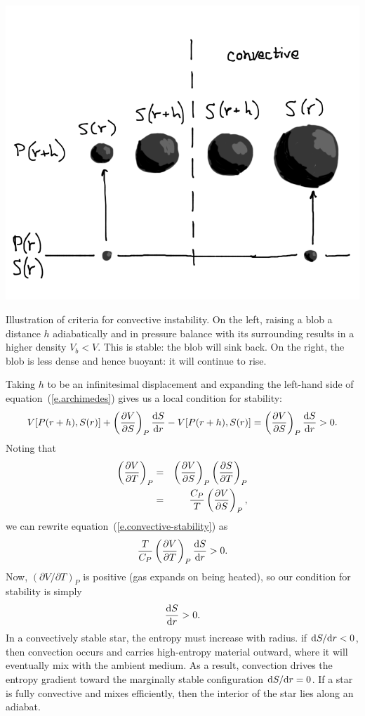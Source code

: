 \begin{marginfigure}
\includegraphics[width=\textwidth]{Figures/convective.png}
\caption{\label{f.convective-schematic}Illustration of criteria for convective instability.  On the left, raising a blob a distance $h$ adiabatically and in pressure balance with its surrounding results in a higher density $V_{b} < V$.  This is stable: the blob will sink back.  On the right, the blob is less dense and hence buoyant: it will continue to rise.}
\end{marginfigure}

Taking $h$ to be an infinitesimal displacement and expanding the left-hand side of equation~(\ref{e.archimedes}) gives us a local condition for stability:
\begin{equation}\label{e.convective-stability}
V[P(r+h),S(r)] + \left(\frac{\partial V}{\partial S}\right)_{P}\frac{\mathrm{d} S}{\mathrm{d} r} - V[P(r+h),S(r)]  = \left(\frac{\partial V}{\partial S}\right)_{P}\frac{\mathrm{d} S}{\mathrm{d} r} > 0 .
\end{equation}
Noting that
\begin{eqnarray*}
\left(\frac{\partial V}{\partial T}\right)_{P} &=& \left(\frac{\partial V}{\partial S}\right)_{P}\left(\frac{\partial S}{\partial T}\right)_{P}\\
 &=& \frac{C_{P}}{T}\left(\frac{\partial V}{\partial S}\right)_{P},
 \end{eqnarray*}
 we can rewrite equation~(\ref{e.convective-stability}) as
 \[
 \frac{T}{C_{P}}\left(\frac{\partial V}{\partial T}\right)_{P}\frac{\mathrm{d} S}{\mathrm{d} r} > 0.
 \]
Now, $(\partial V/\partial T)_{P}$ is positive (gas expands on being heated), so our condition for stability is simply
 \begin{equation}\label{e.entropy-condition}
\frac{\mathrm{d} S}{\mathrm{d} r} > 0.
\end{equation}
In a convectively stable star, the entropy must increase with radius. if $\mathrm{d} S/\mathrm{d} r < 0$, then convection occurs and carries high-entropy material outward, where it will eventually mix with the ambient medium.  As a result, convection drives the entropy gradient toward the marginally stable configuration $\mathrm{d} S/\mathrm{d} r = 0$.  If a star is fully convective and mixes efficiently, then the interior of the star lies along an adiabat. 

